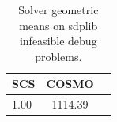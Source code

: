 \begin{table}
\centering
\caption{Solver geometric means on sdplib infeasible debug problems.}
\label{t-sdplib infeasible debug-geom_mean}
\begin{tabular}{lcc}
\toprule
 SCS &   COSMO \\
\midrule
1.00 & 1114.39 \\
\bottomrule
\end{tabular}
\end{table}
